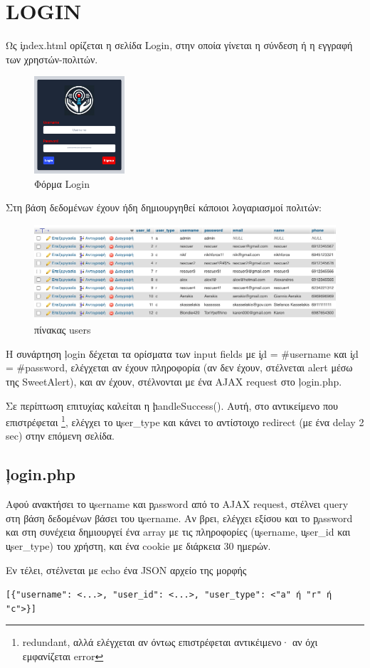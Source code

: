 \section{LOGIN}
    Ως \c{index.html} ορίζεται η σελίδα Login, στην οποία γίνεται η σύνδεση ή η εγγραφή των χρηστών-πολιτών.
    \begin{figure}[H] \noindent \centering
        \includegraphics[width=0.3\textwidth]{img/login}
        \caption{Φόρμα Login}
    \end{figure}

    Στη βάση δεδομένων έχουν ήδη δημιουργηθεί κάποιοι λογαριασμοί πολιτών:

    \begin{figure}[H] \noindent \centering
        \includegraphics[width=\textwidth]{img/sql-users}
        \caption{πίνακας users}
    \end{figure}

        Η συνάρτηση \c{login} δέχεται τα ορίσματα των input fields με \c{id = #username} και \c{id = #password},
            ελέγχεται αν έχουν πληροφορία (αν δεν έχουν, στέλνεται alert μέσω της SweetAlert), και αν έχουν,
            στέλνονται με ένα AJAX request στο \c{login.php}.

        Σε περίπτωση επιτυχίας καλείται η \c{handleSuccess()}.
        Αυτή, στο αντικείμενο που επιστρέφεται \footnote{redundant, αλλά ελέγχεται αν όντως επιστρέφεται αντικέιμενο· αν όχι εμφανίζεται error},
            ελέγχει το \c{user\_type} και κάνει το αντίστοιχο redirect (με ένα delay 2 sec) στην επόμενη σελίδα.

    \subsection{\c{login.php}}
        Αφού ανακτήσει το \c{username} και \c{password} από το AJAX request, στέλνει query στη βάση δεδομένων βάσει του \c{username}.
        Αν βρει, ελέγχει εξίσου και το \c{password} και στη συνέχεια δημιουργεί ένα array με τις πληροφορίες (\c{username}, \c{user\_id} και \c{user\_type}) του χρήστη, και ένα cookie με διάρκεια 30 ημερών.

        Εν τέλει, στέλνεται με echo ένα JSON αρχείο της μορφής
        \begin{graycomment}
            \verb|[{"username": <...>, "user_id": <...>, "user_type": <"a" ή "r" ή "c">}]|
        \end{graycomment}
